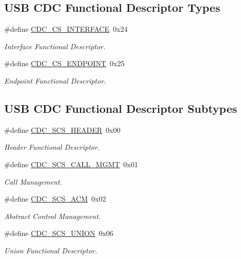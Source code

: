 \subsection*{\-U\-S\-B \-C\-D\-C \-Functional \-Descriptor \-Types}
\begin{DoxyCompactItemize}
\item 
\#define \hyperlink{group__cdc__protocol__group_gafe0ca40b5aacc5c750f952af952583d2}{\-C\-D\-C\-\_\-\-C\-S\-\_\-\-I\-N\-T\-E\-R\-F\-A\-C\-E}~0x24
\begin{DoxyCompactList}\small\item\em \-Interface \-Functional \-Descriptor. \end{DoxyCompactList}\item 
\#define \hyperlink{group__cdc__protocol__group_gae07e10978a48ff63df33c3aeedf84c3a}{\-C\-D\-C\-\_\-\-C\-S\-\_\-\-E\-N\-D\-P\-O\-I\-N\-T}~0x25
\begin{DoxyCompactList}\small\item\em \-Endpoint \-Functional \-Descriptor. \end{DoxyCompactList}\end{DoxyCompactItemize}
\subsection*{\-U\-S\-B \-C\-D\-C \-Functional \-Descriptor \-Subtypes}
\begin{DoxyCompactItemize}
\item 
\#define \hyperlink{group__cdc__protocol__group_gafb7ba01e68938e255cfb6727c5a02f23}{\-C\-D\-C\-\_\-\-S\-C\-S\-\_\-\-H\-E\-A\-D\-E\-R}~0x00
\begin{DoxyCompactList}\small\item\em \-Header \-Functional \-Descriptor. \end{DoxyCompactList}\item 
\#define \hyperlink{group__cdc__protocol__group_gaeda25d7337f810f2bd205b579510ebd4}{\-C\-D\-C\-\_\-\-S\-C\-S\-\_\-\-C\-A\-L\-L\-\_\-\-M\-G\-M\-T}~0x01
\begin{DoxyCompactList}\small\item\em \-Call \-Management. \end{DoxyCompactList}\item 
\#define \hyperlink{group__cdc__protocol__group_gac06eb7a8f7ac43f6be353cc8cc5f8ce8}{\-C\-D\-C\-\_\-\-S\-C\-S\-\_\-\-A\-C\-M}~0x02
\begin{DoxyCompactList}\small\item\em \-Abstract \-Control \-Management. \end{DoxyCompactList}\item 
\#define \hyperlink{group__cdc__protocol__group_ga27581d98e9052d843b2f4767f7d39110}{\-C\-D\-C\-\_\-\-S\-C\-S\-\_\-\-U\-N\-I\-O\-N}~0x06
\begin{DoxyCompactList}\small\item\em \-Union \-Functional \-Descriptor. \end{DoxyCompactList}\end{DoxyCompactItemize}
